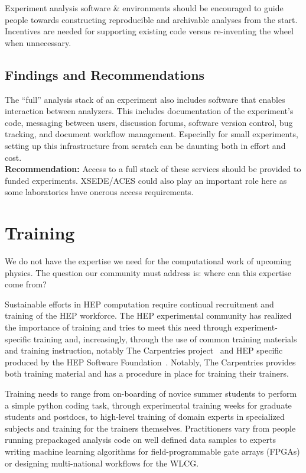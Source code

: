 Experiment analysis software \& environments should be encouraged to guide people towards constructing reproducible and archivable analyses from the start.
Incentives are needed for supporting existing code versus re-inventing the wheel when unnecessary.

\subsection{Findings and Recommendations}
The “full” analysis stack of an experiment also includes software that enables interaction between analyzers. This includes documentation of the experiment's code, messaging between users, discussion forums, software version control, bug tracking, and document workflow management. Especially for small experiments, setting up this infrastructure from scratch can be daunting both in effort and cost.\\
\textbf{Recommendation:} Access to a full stack of these services should be provided to funded experiments.  XSEDE/ACES could also play an important role here as some laboratories have onerous access requirements.

\section{Training}\label{sec:training}

We do not have the expertise we need for the computational work of upcoming physics.  The question our community must address is: where can this expertise come from?

Sustainable efforts in HEP computation require continual recruitment and training of  the HEP workforce. The HEP experimental community has realized the importance of training and tries to meet this need through experiment-specific training and, increasingly, through the use of common training materials and training instruction, notably The Carpentries project~\cite{Carpentries} and HEP specific produced by the HEP Software Foundation~\cite{Malik_2021}.  Notably, The Carpentries provides both training material and has a procedure in place for training their trainers.

Training needs to range from on-boarding of novice summer students to perform a simple python coding task, through experimental training weeks for graduate students and postdocs, to high-level training of domain experts in specialized subjects and training for the trainers themselves. Practitioners vary from people running prepackaged analysis code on well defined data samples to experts writing machine learning algorithms for field-programmable gate arrays (FPGAs) or designing multi-national workflows for the WLCG.  

